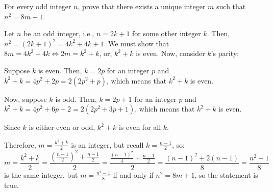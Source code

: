 \begin{recommended}
  For every odd integer $n$, prove that there exists a unique integer $m$ such that $n^2 = 8m + 1$.
\end{recommended}
\begin{prf}
  Let $n$ be an odd integer, i.e., $n = 2k+1$ for some other integer $k$.
  Then, $n^2 = (2k+1)^2 = 4k^2 + 4k + 1$.
  We must show that $8m = 4k^2 + 4k \iff 2m = k^2 + k$, or, $k^2 + k$ is even.
  Now, consider $k$'s parity:

  Suppose $k$ is even.
  Then, $k = 2p$ for an integer $p$ and $k^2 + k = 4p^2 + 2p = 2(2p^2 + p)$,
  which means that $k^2+k$ is even.

  Now, suppose $k$ is odd.
  Then, $k = 2p+1$ for an integer $p$ and $k^2 + k = 4p^2 + 6p + 2 = 2(2p^2 + 3p + 1)$,
  which means that $k^2+k$ is even.

  Since $k$ is either even or odd, $k^2 + k$ is even for all $k$.

  Therefore, $m = \frac{k^2+k}{2}$ is an integer, but recall $k = \frac{n-1}{2}$, so:
  \begin{equation*}
    m = \frac{k^2+k}{2}
    = \frac{\left(\frac{n-1}{2}\right)^2+\frac{n-1}{2}}{2}
    = \frac{\frac{(n-1)^2}{4}+\frac{n-1}{2}}{2}
    = \frac{(n-1)^2 + 2(n-1)}{8}
    = \frac{n^2-1}{8}
  \end{equation*}
  is the same integer, but $m = \frac{n^2-1}{8}$ if and only if $n^2 = 8m + 1$, so the statement is true.
\end{prf}


